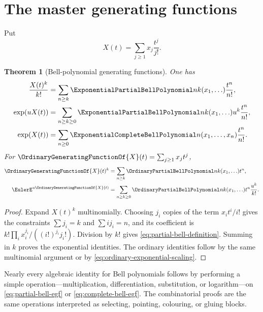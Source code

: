 \documentclass[11pt,a4paper,oneside,openany]{book}
\newtheorem{theorem}{Theorem}[chapter]
\theoremstyle{definition}
\theoremstyle{remark}
\begin{document}
\section{The master generating functions}
Put
\[
 X(t)=\sum_{j\ge1}x_j\frac{t^j}{j!}.
\]
\begin{theorem}[Bell-polynomial generating functions]\label{thm:bell-poly-egf}
One has
\begin{align}
 \frac{X(t)^k}{k!}
 &=\sum_{n\ge k}\ExponentialPartialBellPolynomial nk(x_1,\ldots)\frac{t^n}{n!},\\
 \exp(uX(t))
 &=\sum_{n\ge k\ge0}\ExponentialPartialBellPolynomial nk(x_1,\ldots)u^k\frac{t^n}{n!},\\
 \exp(X(t))
 &=\sum_{n\ge0}\ExponentialCompleteBellPolynomial n(x_1,\ldots,x_n)\frac{t^n}{n!}.
\end{align}
For $\OrdinaryGeneratingFunctionOf{X}(t)=\sum_{j\ge1}x_jt^j$,
\begin{align}
 \OrdinaryGeneratingFunctionOf{X}(t)^k&=\sum_{n\ge k}\OrdinaryPartialBellPolynomial nk(x_1,\ldots)t^n,
 \label{eq:ordinary-bell-ogf}\\
 \EulerE^{u\OrdinaryGeneratingFunctionOf{X}(t)}
 &=\sum_{n\ge k\ge0}\OrdinaryPartialBellPolynomial nk(x_1,\ldots)t^n\frac{u^k}{k!}.
 \label{eq:ordinary-bell-bivariate}
\end{align}
\end{theorem}
\begin{proof}
Expand $X(t)^k$ multinomially.  Choosing $j_i$ copies of the term
$x_it^i/i!$ gives the constraints $\sum j_i=k$ and $\sum ij_i=n$, and its
coefficient is $k!\prod_i x_i^{j_i}/((i!)^{j_i}j_i!)$.  Division by $k!$ gives
\eqref{eq:partial-bell-definition}.  Summing in $k$ proves the exponential
identities.  The ordinary identities follow by the same multinomial argument or
by \eqref{eq:ordinary-exponential-scaling}.
\end{proof}

\begin{masterbox}
Nearly every algebraic identity for Bell polynomials follows by performing a simple
operation---multiplication, differentiation, substitution, or logarithm---on
\eqref{eq:partial-bell-egf} or \eqref{eq:complete-bell-egf}.  The combinatorial
proofs are the same operations interpreted as selecting, pointing, colouring, or
gluing blocks.
\end{masterbox}
\end{document}
